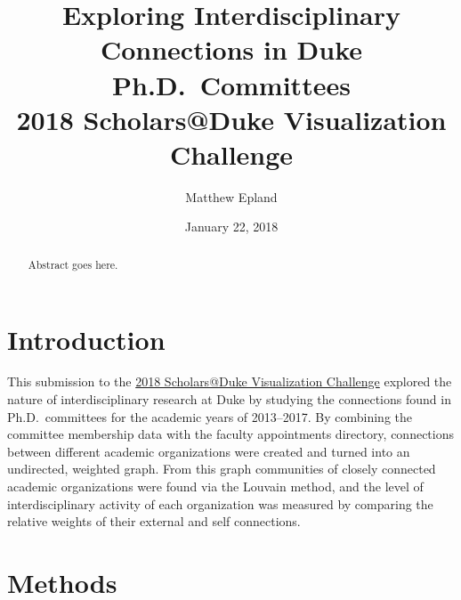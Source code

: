 \documentclass[notitlepage,aps,prd,nofootinbib]{revtex4-1}
\begin{document}
\title{Exploring Interdisciplinary Connections in Duke Ph.D.\ Committees\\2018 Scholars@Duke Visualization Challenge}
\author{Matthew\,\,Epland}
\date{January 22, 2018}

\begin{abstract}
Abstract goes here.%
\end{abstract}

\maketitle

\section{Introduction}
This submission to the \href{https://rc.duke.edu/scholars-vis-challenge-2018/}{2018 Scholars@Duke Visualization Challenge} explored the nature of interdisciplinary research at Duke by studying the connections found in Ph.D.\ committees for the academic years of 2013--2017. By combining the committee membership data with the faculty appointments directory, connections between different academic organizations were created and turned into an undirected, weighted graph. From this graph communities of closely connected academic organizations were found via the Louvain method, and the level of interdisciplinary activity of each organization was measured by comparing the relative weights of their external and self connections.

\section{Methods}
\end{document}
